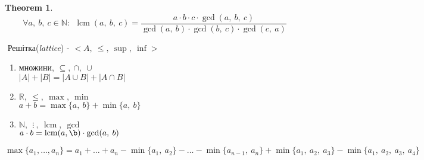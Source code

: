 \documentclass[a4paper,12pt]{bookest}
\newtheorem{theorem}{Theorem}[section]
\DeclareMathOperator{\lcm}{lcm}
\begin{document}
\begin{theorem}
$$\forall a,\>b,\>c\in\mathbb{N}:\>\>\lcm(a,\>b,\>c)=\frac{a\cdot b\cdot c\cdot \gcd(a,\>b,\>c)}{\gcd(a,\>b)\cdot\gcd(b,\>c)\cdot\gcd(c,\>a)}$$	
\end{theorem}$ $
Решітка(\emph{lattice}) - $<A,\>\leq,\>\sup,\>\inf>$
\begin{example}
	\begin{enumerate}
		\item множини, $\subseteq,\>\cap,\>\cup$\\
		$|A|+|B|=|A\cup B|+|A\cap B|$
		\item $\mathbb{R},\>\leq,\>\max,\>\min$\\
		$a+b=\max\{a,\>b\}+\min\{a,\>b\}$
		\item $\mathbb{N},\>\>\vdots\>,\>\lcm,\>\gcd$\\
		$a\cdot b=\lcm(a,\b)\cdot\gcd(a,\>b)$
	\end{enumerate}
	$\max \{a_1,\dots,a_n\}=a_1+\dots+a_n-\min\{a_1,\>a_2\}-\dots-\min\{a_{n-1},\>a_n\}+\min\{a_1,\>a_2,\>a_3\}-\min\{a_1,\>a_2,\>a_3,\>a_4\}$	
\end{example}	
\end{document}
